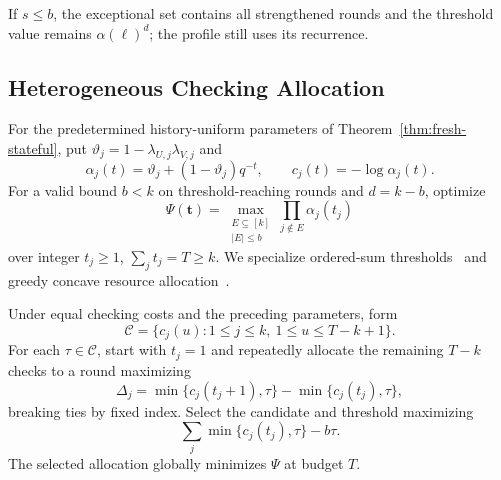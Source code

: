 If $s\le b$, the exceptional set contains all strengthened rounds and the
threshold value remains $\alpha(\ell)^d$; the profile still uses its recurrence.

\subsection{Heterogeneous Checking Allocation}
\label{ext:sec-heterogeneous}

For the predetermined history-uniform parameters of
Theorem~\ref{thm:fresh-stateful}, put
$\vartheta_j=1-\lambda_{U,j}\lambda_{V,j}$ and
\[
\alpha_j(t)=\vartheta_j+(1-\vartheta_j)q^{-t},\qquad
c_j(t)=-\log\alpha_j(t).
\]
For a valid bound $b<k$ on threshold-reaching rounds and $d=k-b$, optimize
\begin{equation}
\Psi(\mathbf t)=\max_{\substack{E\subseteq[k]\\|E|\le b}}
                     \prod_{j\notin E}\alpha_j(t_j)
\label{ext:eq-hetero-objective}
\end{equation}
over integer $t_j\ge1$, $\sum_jt_j=T\ge k$.
We specialize ordered-sum thresholds~\cite{OgryczakTamir2003} and greedy
concave resource allocation~\cite{FedergruenGroenevelt1986}.

\begin{theorem}
\label{ext:thm-heterogeneous}
Under equal checking costs and the preceding parameters, form
\[
\mathcal C=\{c_j(u):1\le j\le k,\ 1\le u\le T-k+1\}.
\]
For each $\tau\in\mathcal C$, start with $t_j=1$ and repeatedly allocate
the remaining $T-k$ checks to a round maximizing
\begin{equation}
\Delta_j=\min\{c_j(t_j+1),\tau\}-\min\{c_j(t_j),\tau\},
\label{ext:eq-hetero-gain}
\end{equation}
breaking ties by fixed index. Select the candidate and threshold maximizing
\begin{equation}
\sum_j\min\{c_j(t_j),\tau\}-b\tau.
\label{ext:eq-hetero-score}
\end{equation}
The selected allocation globally minimizes $\Psi$ at budget $T$.
\end{theorem}

